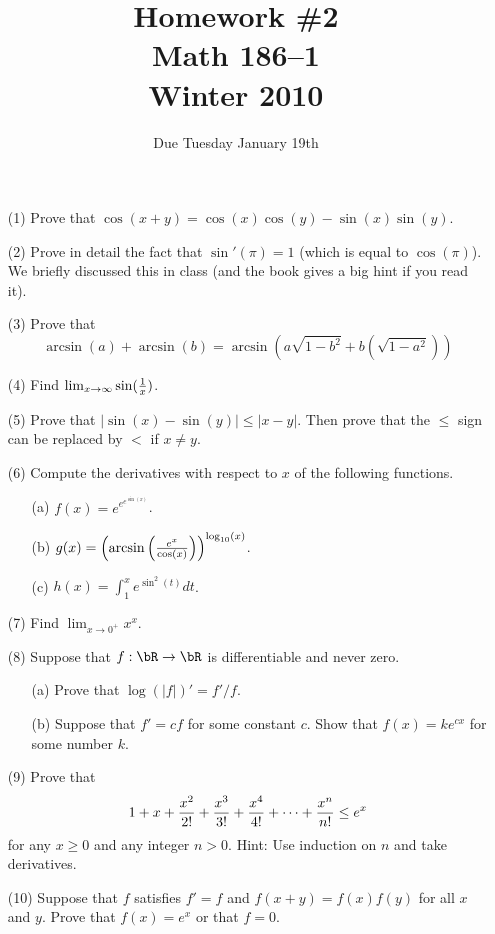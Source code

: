 \documentclass[11pt,twoside,fullpage]{amsart}
\begin{document}
\title{Homework \#2\\Math 186--1\\Winter 2010}
\author{Due Tuesday January 19th}
\maketitle

\begin{itemize}
\item[(1)]  Prove that $\cos(x + y) = \cos(x) \cos(y) - \sin(x) \sin(y)$.
\item[(2)]  Prove in detail the fact that $\sin'(\pi) = 1$ (which is equal to $\cos(\pi)$).  We briefly discussed this in class (and the book gives a big hint if you read it).
\item[(3)]  Prove that
\[
 \arcsin(a) + \arcsin(b) = \arcsin\left(a\sqrt{1 - b^2} + b(\sqrt{1-a^2}) \right)
\]
\item[(4)]  Find $\lim_{x \to \infty} \sin({1 \over x})$.
\item[(5)]  Prove that $|\sin(x) - \sin(y) | \leq |x - y|$.  Then prove that the $\leq$ sign can be replaced by $<$ if $x \neq y$.
\item[(6)]  Compute the derivatives with respect to $x$ of the following functions.
\begin{itemize}
\item[(a)]  $f(x) = e^{e^{e^{\sin(x)}}}$.
\item[(b)]  $g(x) = \left(\arcsin\left({e^{x} \over \cos(x) }\right) \right)^{\log_{10}(x)}$.
\item[(c)]  $h(x) = \int^{x}_1 e^{\sin^2(t)} dt$.
\end{itemize}
\item[(7)]  Find $\lim_{x \to 0^+} x^x$.
\item[(8)]  Suppose that $f : \bR \to \bR$ is differentiable and never zero.
\begin{itemize}
 \item[(a)]  Prove that $\log(|f|)' = f'/f$.
\item[(b)]  Suppose that $f' = cf$ for some constant $c$.  Show that $f(x) = k e^{cx}$ for some number $k$.
\end{itemize}
\item[(9)]  Prove that
\[
 1 + x + {x^2 \over 2!} + {x^3 \over 3!} + {x^4 \over 4!} + \dots + {x^n \over n!} \leq e^x
\]
for any $x \geq 0$ and any integer $n > 0$.  Hint:  Use induction on $n$ and take derivatives.
\item[(10)]  Suppose that $f$ satisfies $f' = f$ and $f(x+y) = f(x) f(y)$ for all $x$ and $y$.  Prove that $f(x) = e^x$ or that $f = 0$.
\end{itemize}
\end{document}
